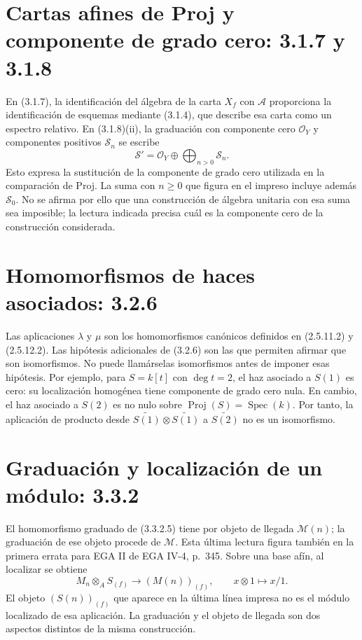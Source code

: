 \documentclass[11pt,a4paper]{article}
\DeclareMathOperator{\Spec}{Spec}
\DeclareMathOperator{\Proj}{Proj}
\begin{document}
\section{Cartas afines de Proj y componente de grado cero: 3.1.7 y 3.1.8}
En (3.1.7), la identificación del álgebra de la carta $X_f$ con
$\mathcal A$ proporciona la identificación de esquemas mediante
(3.1.4), que describe esa carta como un espectro relativo.
En (3.1.8)(ii), la graduación con componente cero $\mathcal O_Y$
y componentes positivos $\mathcal S_n$ se escribe
\[
\mathcal S'=\mathcal O_Y\oplus\bigoplus_{n>0}\mathcal S_n.
\]
Esto expresa la sustitución de la componente de grado cero utilizada
en la comparación de Proj. La suma con $n\geq0$ que figura en el
impreso incluye además $\mathcal S_0$. No se afirma por ello que
una construcción de álgebra unitaria con esa suma sea imposible;
la lectura indicada precisa cuál es la componente cero de la
construcción considerada.

\section{Homomorfismos de haces asociados: 3.2.6}
Las aplicaciones $\lambda$ y $\mu$ son los homomorfismos canónicos
definidos en (2.5.11.2) y (2.5.12.2). Las hipótesis adicionales de
(3.2.6) son las que permiten afirmar que son isomorfismos.
No puede llamárselas isomorfismos antes de imponer esas hipótesis.
Por ejemplo, para $S=k[t]$ con $\deg t=2$, el haz asociado a $S(1)$
es cero: su localización homogénea tiene componente de grado cero
nula. En cambio, el haz asociado a $S(2)$ es no nulo sobre
$\Proj(S)=\Spec(k)$. Por tanto, la aplicación de producto desde
$\widetilde{S(1)}\otimes\widetilde{S(1)}$ a
$\widetilde{S(2)}$ no es un isomorfismo.

\section{Graduación y localización de un módulo: 3.3.2}
El homomorfismo graduado de (3.3.2.5) tiene por objeto de llegada
$\mathcal M(n)$; la graduación de ese objeto procede de $\mathcal M$.
Esta última lectura figura también en la primera errata para EGA II
de EGA IV-4, p.~345. Sobre una base afín, al localizar se obtiene
\[
M_n\otimes_A S_{(f)}\longrightarrow (M(n))_{(f)},
\qquad x\otimes1\longmapsto x/1.
\]
El objeto $(S(n))_{(f)}$ que aparece en la última línea impresa no es
el módulo localizado de esa aplicación. La graduación y el objeto de
llegada son dos aspectos distintos de la misma construcción.
\end{document}
